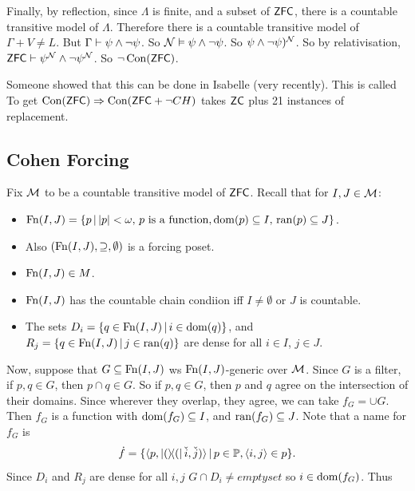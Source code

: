 \documentclass{article}
\begin{document}
    Finally, by reflection, since $\Lambda$ is finite, and a subset of $\mathsf{ZFC}$, there is a countable transitive model of $\Lambda$. Therefore there is a countable transitive model of $\Gamma + V \neq L$. But $\Gamma \vdash \psi \wedge \neg \psi$. So $\mathcal{N} \vDash \psi \wedge \neg \psi$. So $\psi \wedge \neg \psi)^{\mathcal{N}}$. So by relativisation, $\mathsf{ZFC} \vdash \psi^{\mathcal{N}} \wedge \neg \psi^{\mathcal{N}}$. So $\neg \operatorname{Con}(\mathsf{ZFC})$. \endproof
    \begin{remark*}
        Someone showed that this can be done in Isabelle (very recently). This is called  \gap
        To get $\operatorname{Con}(\mathsf{ZFC}) \Rightarrow \operatorname{Con}(\mathsf{ZFC} + \neg CH)$ takes $\mathsf{ZC}$ plus 21 instances of replacement.
    \end{remark*}
    \subsection{Cohen Forcing}
    Fix $\mathcal{M}$ to be a countable transitive model of $\mathsf{ZFC}$. Recall that for $I,J \in \mathcal{M}$: \begin{itemize}
        \item $\operatorname{Fn}(I,J)= \{ p \, | \, |p| < \omega, \, p \text{ is a function}, \operatorname{dom}(p) \subseteq I, \, \operatorname{ran}(p) \subseteq J\}$.
        \item Also $(\operatorname{Fn}(I,J),\supseteq,\emptyset)$ is a forcing poset.
        \item $\operatorname{Fn}(I,J) \in M$.
        \item $\operatorname{Fn}(I,J)$ has the countable chain condiion iff $I \neq \emptyset$ or $J$ is countable.
        \item The sets $D_{i} = \{ q \in \operatorname{Fn}(I,J)\, | \, i \in \operatorname{dom}(q)\}$, and $R_{j} = \{ q \in \operatorname{Fn}(I,J)\, | \, j \in \operatorname{ran}(q)\}$ are dense for all $i \in I$, $j \in J$.
    \end{itemize}
    Now, suppose that $G \subseteq \operatorname{Fn}(I,J)$ ws $\operatorname{Fn}(I,J)$-generic over $\mathcal{M}$. Since $G$ is a filter, if $p,q \in G$, then $p \cap q \in G$. So if $p, q \in G$, then $p$ and $q$ agree on the intersection of their domains. \gap
    Since wherever they overlap, they agree, we can take $f_{G} = \cup G$. Then $f_{G}$ is a function with $\operatorname{dom}(f_{G}) \subseteq I$, and $\operatorname{ran}(f_{G}) \subseteq J$. Note that a name for $f_{G}$ is \[ \dot{f} = \{ \langle p, \op(\check{i}, \check{j})\rangle \, | \, p \in \mathbb{P}, \langle i, j \rangle \in p\}.\]
    Since $D_{i}$ and $R_{j}$ are dense for all $i,j$ $G \cap D_{i} \neq emptyset$ %
    so $i \in \operatorname{dom}(f_{G})$. Thus
\end{document}
